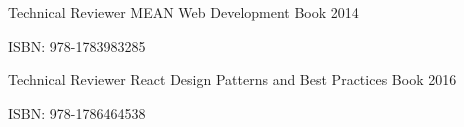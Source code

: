 \begin{cventries}
  \cventry
    {Technical Reviewer}
    {MEAN Web Development}
    {Book}
    {2014}
    {
      \begin{cvitems}
        \item {ISBN: 978-1783983285}
      \end{cvitems}
    }
  \cventry
    {Technical Reviewer}
    {React Design Patterns and Best Practices}
    {Book}
    {2016}
    {
      \begin{cvitems}
        \item {ISBN: 978-1786464538}
      \end{cvitems}
    }
\end{cventries}
